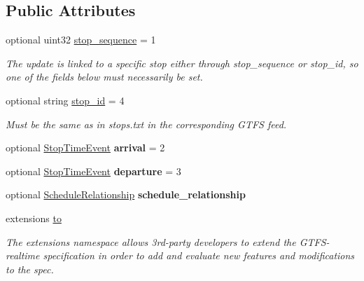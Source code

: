 \subsection*{Public Attributes}
\begin{DoxyCompactItemize}
\item 
optional uint32 \hyperlink{structTripUpdate_1_1StopTimeUpdate_a0d9f654ecd536657ee00b1c1cbe428aa}{stop\+\_\+sequence} = 1
\begin{DoxyCompactList}\small\item\em The update is linked to a specific stop either through stop\+\_\+sequence or stop\+\_\+id, so one of the fields below must necessarily be set. \end{DoxyCompactList}\item 
optional string \hyperlink{structTripUpdate_1_1StopTimeUpdate_a2e9f0d502733a40600e161ecc5ccb341}{stop\+\_\+id} = 4\hypertarget{structTripUpdate_1_1StopTimeUpdate_a2e9f0d502733a40600e161ecc5ccb341}{}\label{structTripUpdate_1_1StopTimeUpdate_a2e9f0d502733a40600e161ecc5ccb341}

\begin{DoxyCompactList}\small\item\em Must be the same as in stops.\+txt in the corresponding G\+T\+FS feed. \end{DoxyCompactList}\item 
optional \hyperlink{structTripUpdate_1_1StopTimeEvent}{Stop\+Time\+Event} {\bfseries arrival} = 2\hypertarget{structTripUpdate_1_1StopTimeUpdate_ad93d1fbf08d9aaa68cd88564d6f6f4f8}{}\label{structTripUpdate_1_1StopTimeUpdate_ad93d1fbf08d9aaa68cd88564d6f6f4f8}

\item 
optional \hyperlink{structTripUpdate_1_1StopTimeEvent}{Stop\+Time\+Event} {\bfseries departure} = 3\hypertarget{structTripUpdate_1_1StopTimeUpdate_a7442ac9c2bd4ba8b1752298ff983ea27}{}\label{structTripUpdate_1_1StopTimeUpdate_a7442ac9c2bd4ba8b1752298ff983ea27}

\item 
optional \hyperlink{structTripUpdate_1_1StopTimeUpdate_a624ef1349bfc24a44984c33761070726}{Schedule\+Relationship} {\bfseries schedule\+\_\+relationship}
\item 
extensions \hyperlink{structTripUpdate_1_1StopTimeUpdate_ae4536522e5c97e4a800017600600a7dc}{to}
\begin{DoxyCompactList}\small\item\em The extensions namespace allows 3rd-\/party developers to extend the G\+T\+F\+S-\/realtime specification in order to add and evaluate new features and modifications to the spec. \end{DoxyCompactList}\end{DoxyCompactItemize}


